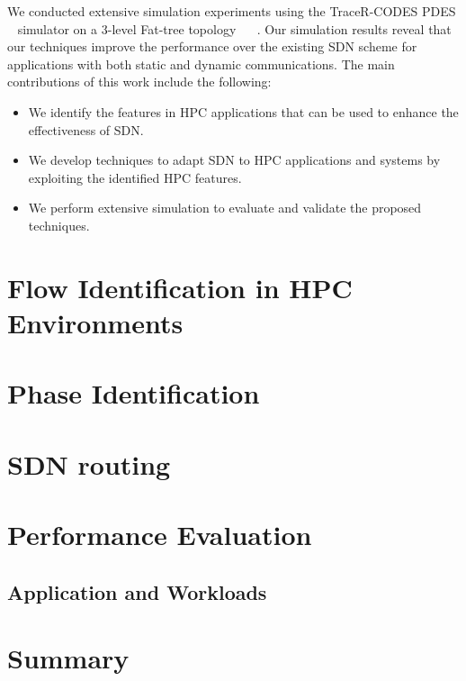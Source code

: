We conducted extensive simulation experiments using the
TraceR-CODES
\cite{jain2016evaluating,mubarak2016enabling,jain2017predicting}
PDES ~\cite{fujimoto1990parallel} simulator on a 3-level
Fat-tree topology ~\cite{leiserson1985fat} ~\cite{al2008scalable}. Our
simulation results reveal that our techniques improve the performance
over the existing SDN
scheme for applications with both static and dynamic communications.
The main contributions of this work include the following:
%
\begin{itemize}
\item We identify the features in HPC applications that can be used
  to enhance the effectiveness of SDN.
\item We develop techniques to adapt SDN to HPC applications and
  systems by exploiting the identified HPC features.
\item We perform extensive simulation to evaluate and validate
  the proposed techniques.
\end{itemize}


\section{Flow Identification in HPC Environments}
\label{sec:flow_identification}

\section{Phase Identification}
\label{sec:phase_identification}

\section{SDN routing}
\label{sec:sdn_routing}

\section{Performance Evaluation}

\subsection{Application and Workloads}


\section{Summary}

